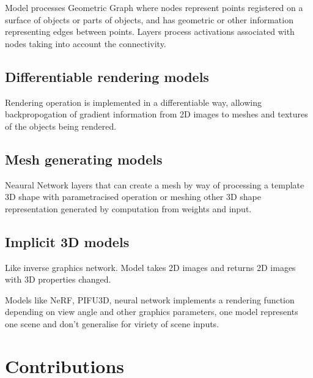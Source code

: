 Model processes Geometric Graph where nodes represent points registered on a surface of objects or parts of objects, and has geometric or other information representing edges between points. Layers process activations associated with nodes taking into account the connectivity.

\subsection{Differentiable rendering models}

Rendering operation is implemented in a differentiable way, allowing backpropogation of gradient information from 2D images to meshes and textures of the objects being rendered.

\subsection{Mesh generating models}

Neaural Network layers that can create a mesh by way of processing a template 3D shape with parametracised operation or meshing other 3D shape representation generated by computation from weights and input.

\subsection{Implicit 3D models}
Like inverse graphics network. Model takes 2D images and returns 2D images with 3D properties changed. 

Models like NeRF, PIFU3D, neural network implements a rendering function depending on view angle and other graphics parameters, one model represents one scene and don't generalise for viriety of scene inputs.


\section{Contributions}

 

